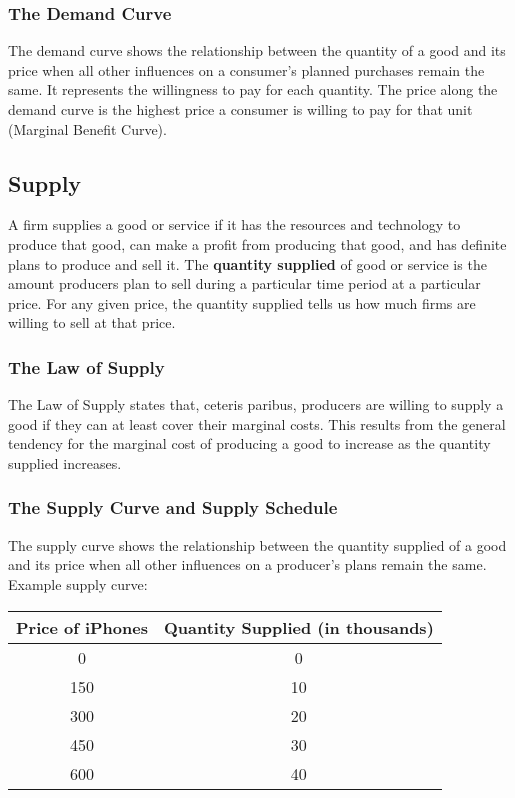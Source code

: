 \documentclass{article}
\begin{document}
\subsubsection{The Demand Curve}
The demand curve shows the relationship between the quantity of a good and
its price when all other influences on a consumer's planned purchases remain
the same. It represents the willingness to pay for each quantity. The price
along the demand curve is the highest price a consumer is willing to pay
for that unit (Marginal Benefit Curve).

\subsection{Supply}
A firm supplies a good or service if it has the resources and technology to
produce that good, can make a profit from producing that good, and has
definite plans to produce and sell it. The \textbf{quantity supplied} of good
or service is the amount producers plan to sell during a particular time
period at a particular price. For any given price, the quantity supplied
tells us how much firms are willing to sell at that price.

\subsubsection{The Law of Supply}
The Law of Supply states that, ceteris paribus, producers are willing to supply
a good if they can at least cover their marginal costs. This results from the
general tendency for the marginal cost of producing a good to increase as the
quantity supplied increases.

\subsubsection{The Supply Curve and Supply Schedule}
The supply curve shows the relationship between the quantity supplied of a good
and its price when all other influences on a producer's plans remain the same.
Example supply curve:
\begin{center}
  \begin{tabular}{|c|c|}
    \hline
    Price of iPhones & Quantity Supplied (in thousands) \\ \hline
    0   & 0  \\ \hline
    150 & 10 \\ \hline
    300 & 20 \\ \hline
    450 & 30 \\ \hline
    600 & 40 \\ \hline
  \end{tabular}
\end{center}
\end{document}
